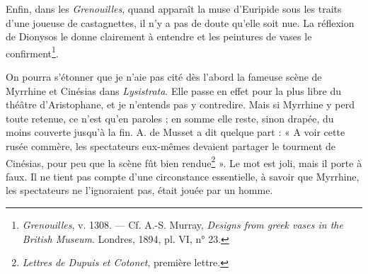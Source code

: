 \documentclass{book}%
\newcommand{\italique}[1]{\textit{#1}}%
\newcommand{\note}[1]{\footnote{#1}}
\begin{document}
Enfin, dans les \italique{Grenouilles}, quand apparaît la muse d'Euripide sous les traits d'une joueuse de castagnettes, il n'y a pas de doute qu'elle soit nue. La réflexion de Dionysos le donne clairement à entendre et les peintures de vases le confirment\note{\italique{Grenouilles}, v. 1308. — Cf. A.-S. Murray, \italique{Designs from greek vases in the British Museum}. Londres, 1894, pl. VI, n° 23.}. 

On pourra s'étonner que je n'aie pas cité dès l'abord la fameuse scène de Myrrhine et Cinésias dans \italique{Lysistrata}. Elle passe en effet pour la plus libre du théâtre d'Aristophane, et je n'entends pas y contredire. Mais si Myrrhine y perd toute retenue, ce n'est qu'en paroles ; en somme elle reste, sinon drapée, du moins couverte jusqu'à la fin. A. de Musset a dit quelque part : « A voir cette rusée commère, les spectateurs eux-mêmes devaient partager le tourment de Cinésias, pour peu que la scène fût bien rendue\note{\italique{Lettres de Dupuis et Cotonet}, première lettre.} ». Le mot est joli, mais il porte à faux. Il ne tient pas compte d'une circonstance essentielle, à savoir que Myrrhine, les spectateurs ne l'ignoraient pas, était jouée par un homme. 
\end{document}
